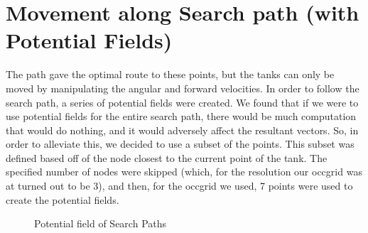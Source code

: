 \documentclass{article}
\begin{document}
\section{Movement along Search path (with Potential Fields)}
The path gave the optimal route to these points, but the tanks can only be moved by manipulating the angular and forward velocities.  In order to follow the search path, a series of potential fields were created.  We found that if we were to use potential fields for the entire search path, there would be much computation that would do nothing, and it would adversely affect the resultant vectors.  So, in order to alleviate this, we decided to use a subset of the points.  This subset was defined based off of the node closest to the current point of the tank.  The specified number of nodes were skipped (which, for the resolution our occgrid was at turned out to be 3), and then, for the occgrid we used, 7 points were used to create the potential fields.  
\begin{figure}[h!tb]
	\caption{Potential field of Search Paths}
\end{figure}
\end{document}
